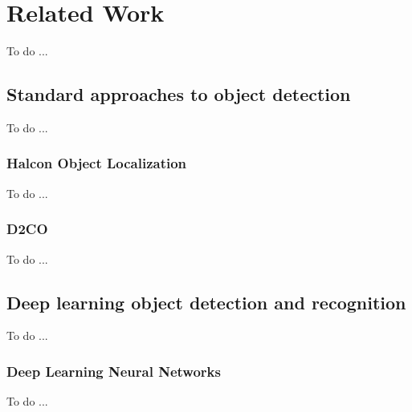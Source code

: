 \chapter{Related Work}\label{ch:related}
To do ...

\section{Standard approaches to object detection}\label{sec:std_obj_det}
To do ...

\subsection{Halcon Object Localization}\label{sec:halcon_localization}
To do ...

\subsection{D2CO}\label{sec:D2CO_localization}
To do ...

\section{Deep learning object detection and recognition}\label{sec:deep_learning_section}
To do ...

\subsection{Deep Learning Neural Networks}\label{sec:deep_learning_networks}
To do ...